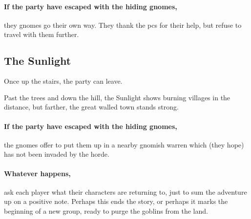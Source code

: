 \begin{multicols}{2}
{  \paragraph{If the party have escaped with the hiding gnomes,}
  they gnomes go their own way.
  They thank the \glspl{pc} for their help, but refuse to travel with them further.
}{
  \subsection{The Sunlight}

  \noindent
  Once up the stairs, the party can leave.

  \begin{boxtext}
    Past the trees and down the hill, the Sunlight shows burning villages in the distance, but farther, the great walled town stands strong.
  \end{boxtext}

  \paragraph{If the party have escaped with the hiding gnomes,}
  the gnomes offer to put them up in a nearby gnomish \gls{warren} which (they hope) has not been invaded by the horde.

  \paragraph{Whatever happens,}
  ask each player what their characters are returning to, just to sum the adventure up on a positive note.
  Perhaps this ends the story, or perhaps it marks the beginning of a new group, ready to purge the goblins from the land.
}


\end{multicols}

